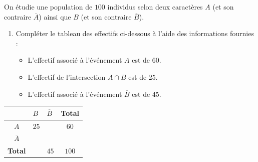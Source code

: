 \begin{exo}
	On étudie une population de $100$ individus selon deux caractères $A$ (et son contraire $\overline{A}$) ainsi que $B$ (et son contraire $\overline{B}$).

	\begin{enumerate}
		\item Compléter le tableau des effectifs ci-dessous à l'aide des informations fournies :
		      \begin{itemize}
			      \item L'effectif associé à l'événement $A$ est de $60$.
			      \item L'effectif de l'intersection $A \cap B$ est de $25$.
			      \item L'effectif associé à l'événement $\overline{B}$ est de $45$.
		      \end{itemize}
	\end{enumerate}
	\begin{center}
		\renewcommand{\arraystretch}{1.2}
		\begin{tabular}{|c|C{2cm}|C{2cm}|c|}
			\hline
			               & $B$  & $\overline{B}$ & \textbf{Total} \\ \hline
			$A$            & $25$ &                & $60$           \\ \hline
			$\overline{A}$ &      &                &                \\ \hline
			\textbf{Total} &      & $45$           & $100$          \\ \hline
		\end{tabular}
	\end{center}
\end{exo}

